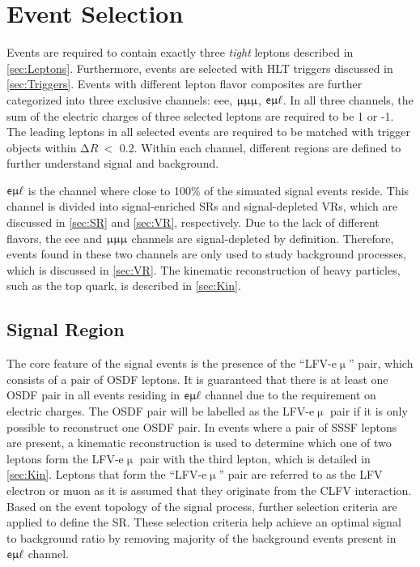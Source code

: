 \chapter{Event Selection}
\label{chap:Selection}

Events are required to contain exactly three \emph{tight} leptons described in \autoref{sec:Leptons}. Furthermore, events are selected with HLT triggers discussed in \autoref{sec:Triggers}. Events with different lepton flavor composites are further categorized into three exclusive channels: eee, $\upmu\upmu\upmu$, $\textsf{e}\upmu\ell$. In all three channels, the sum of the electric charges of three selected leptons are required to be 1 or -1. The leading leptons in all selected events are required to be matched with trigger objects within $\mathrm{\Delta} R~<$ 0.2. Within each channel, different regions are defined to further understand signal and background.

$\textsf{e}\upmu\ell$ is the channel where close to 100\% of the simuated signal events reside. This channel is divided into signal-enriched \acp{SR} and signal-depleted \acp{VR}, which are discussed in \autoref{sec:SR} and \autoref{sec:VR}, respectively. Due to the lack of different flavors, the eee and $\upmu\upmu\upmu$ channels are signal-depleted by definition. Therefore, events found in these two channels are only used to study background processes, which is discussed in \autoref{sec:VR}. The kinematic reconstruction of heavy particles, such as the top quark, is described in \autoref{sec:Kin}.
\section{Signal Region}
\label{sec:SR}

The core feature of the signal events is the presence of the ``LFV-e$\upmu$'' pair, which consists of a pair of \ac{OSDF} leptons. It is guaranteed that there is at least one \ac{OSDF} pair in all events residing in $\textsf{e}\upmu\ell$ channel due to the requirement on electric charges. The \ac{OSDF} pair will be labelled as the LFV-e$\upmu$ pair if it is only possible to reconstruct one \ac{OSDF} pair. In events where a pair of \ac{SSSF} leptons are present, a kinematic reconstruction is used to determine which one of two leptons form the LFV-e$\upmu$ pair with the third lepton, which is detailed in \autoref{sec:Kin}. Leptons that form the ``LFV-e$\upmu$'' pair are referred to as the LFV electron or muon as it is assumed that they originate from the \ac{CLFV} interaction. Based on the event topology of the signal process, further selection criteria are applied to define the \ac{SR}. These selection criteria help achieve an optimal signal to background ratio by removing majority of the background events present in $\textsf{e}\upmu\ell$ channel. 

